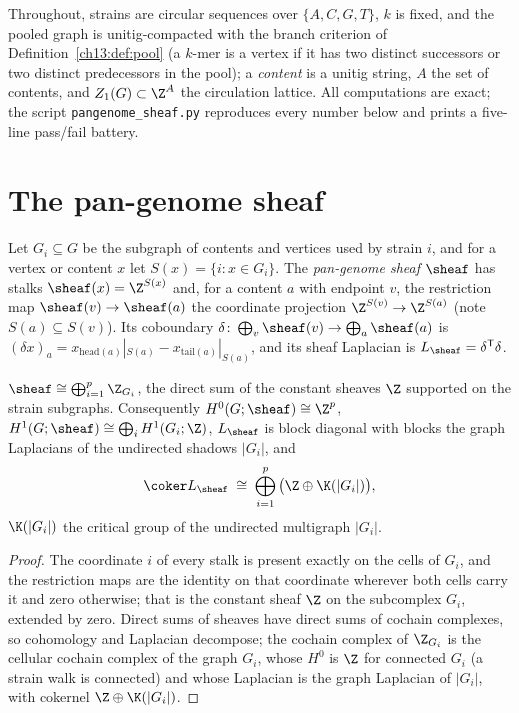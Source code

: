 Throughout, strains are circular sequences over $\{A,C,G,T\}$, $k$ is fixed, and the pooled
graph is unitig-compacted with the branch criterion of Definition~\ref{ch13:def:pool} (a $k$-mer is a vertex if
it has two distinct successors or two distinct predecessors in the pool); a \emph{content}
is a unitig string, $A$ the set of contents, and $Z_1(G)\subset\Z^A$ the circulation lattice.
All computations are exact; the script \texttt{pangenome\_sheaf.py} reproduces every number
below and prints a five-line pass/fail battery.

\section{The pan-genome sheaf}\label{ch14:sec:sheaf}

\begin{definition}\label{ch14:def:sheaf}
Let $G_i\subseteq G$ be the subgraph of contents and vertices used by strain $i$, and for a
vertex or content $x$ let $S(x)=\{i:x\in G_i\}$. The \emph{pan-genome sheaf} $\sheaf$ has
stalks $\sheaf(x)=\Z^{S(x)}$ and, for a content $a$ with endpoint $v$, the restriction map
$\sheaf(v)\to\sheaf(a)$ the coordinate projection $\Z^{S(v)}\to\Z^{S(a)}$ (note
$S(a)\subseteq S(v)$). Its coboundary $\delta\colon\bigoplus_v\sheaf(v)\to\bigoplus_a\sheaf(a)$
is $(\delta x)_a=x_{\mathrm{head}(a)}|_{S(a)}-x_{\mathrm{tail}(a)}|_{S(a)}$, and its sheaf
Laplacian is $L_\sheaf=\delta^{\mathsf T}\delta$.
\end{definition}

\begin{proposition}\label{ch14:prop:sheaf}
$\sheaf\cong\bigoplus_{i=1}^p\Z_{G_i}$, the direct sum of the constant sheaves $\Z$ supported
on the strain subgraphs. Consequently $H^0(G;\sheaf)\cong\Z^p$,
$H^1(G;\sheaf)\cong\bigoplus_iH^1(G_i;\Z)$, $L_\sheaf$ is block diagonal with blocks the
graph Laplacians of the undirected shadows $|G_i|$, and
\[
  \coker L_\sheaf\;\cong\;\bigoplus_{i=1}^p\big(\Z\oplus\K(|G_i|)\big),
\]
$\K(|G_i|)$ the critical group of the undirected multigraph $|G_i|$.
\end{proposition}

\begin{proof}
The coordinate $i$ of every stalk is present exactly on the cells of $G_i$, and the
restriction maps are the identity on that coordinate wherever both cells carry it and zero
otherwise; that is the constant sheaf $\Z$ on the subcomplex $G_i$, extended by zero. Direct
sums of sheaves have direct sums of cochain complexes, so cohomology and Laplacian decompose;
the cochain complex of $\Z_{G_i}$ is the cellular cochain complex of the graph $G_i$, whose
$H^0$ is $\Z$ for connected $G_i$ (a strain walk is connected) and whose Laplacian is the
graph Laplacian of $|G_i|$, with cokernel $\Z\oplus\K(|G_i|)$.
\end{proof}

